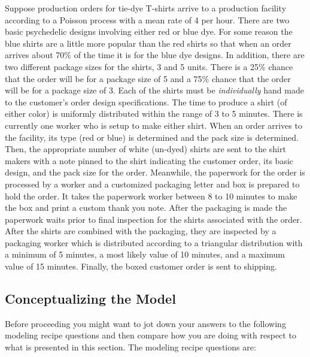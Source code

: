 \documentclass[
]{book}
\theoremstyle{definition}
\theoremstyle{definition}
\theoremstyle{definition}
\theoremstyle{definition}
\theoremstyle{remark}
\begin{document}
Suppose production orders for tie-dye T-shirts arrive to a production
facility according to a Poisson process with a mean rate of 4 per hour.
There are two basic psychedelic designs involving either red or blue
dye. For some reason the blue shirts are a little more popular than the
red shirts so that when an order arrives about 70\% of the time it is for
the blue dye designs. In addition, there are two different package sizes
for the shirts, 3 and 5 units. There is a 25\% chance that the order will
be for a package size of 5 and a 75\% chance that the order will be for a
package size of 3. Each of the shirts must be \emph{individually} hand made
to the customer's order design specifications. The time to produce a
shirt (of either color) is uniformly distributed within the range of 3
to 5 minutes. There is currently one worker who is setup to make either
shirt. When an order arrives to the facility, its type (red or blue) is
determined and the pack size is determined. Then, the appropriate number
of white (un-dyed) shirts are sent to the shirt makers with a note
pinned to the shirt indicating the customer order, its basic design, and
the pack size for the order. Meanwhile, the paperwork for the order is
processed by a worker and a customized packaging letter and box is
prepared to hold the order. It takes the paperwork worker between 8 to
10 minutes to make the box and print a custom thank you note. After the
packaging is made the paperwork waits prior to final inspection for the
shirts associated with the order. After the shirts are combined with the
packaging, they are inspected by a packaging worker which is distributed
according to a triangular distribution with a minimum of 5 minutes, a
most likely value of 10 minutes, and a maximum value of 15 minutes.
Finally, the boxed customer order is sent to shipping.

\hypertarget{dem:tiedyeShirts:cm}{%
\subsection{Conceptualizing the Model}\label{dem:tiedyeShirts:cm}}

Before proceeding you might want to jot down your answers to the
following modeling recipe questions and then compare how you are doing
with respect to what is presented in this section. The modeling recipe
questions are:
\end{document}
